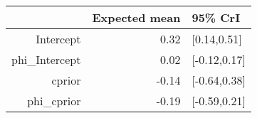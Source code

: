 \begin{tabular}{rrl}
  \hline
 & Expected mean & 95\% CrI \\ 
  \hline
Intercept & 0.32 & [0.14,0.51] \\ 
  phi\_Intercept & 0.02 & [-0.12,0.17] \\ 
  cprior & -0.14 & [-0.64,0.38] \\ 
  phi\_cprior & -0.19 & [-0.59,0.21] \\ 
   \hline
\end{tabular}

